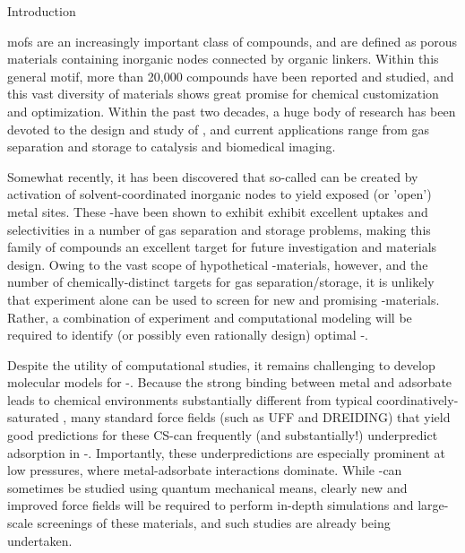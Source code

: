 \begin{section}{Introduction}

\Glspl{mof} are an increasingly important class of compounds, and are
defined as porous
materials containing inorganic nodes connected by organic linkers. Within
this general motif, more than 20,000 compounds have been reported and
studied,\cite{Furukawa2013} and this vast diversity of \mof materials shows great promise
for chemical customization and optimization. Within the past two decades, a
huge body of research has been devoted to the design and study of \mofs, and
current applications range from gas separation and storage to catalysis and
biomedical imaging.\cite{Furukawa2013}

Somewhat recently, it has been discovered that so-called \cus \mofs can be
created by activation of solvent-coordinated inorganic nodes to yield exposed
(or 'open') metal sites.\cite{Millward2005b,Dietzel2009,Dzubak2012} These \cus-\mofs have
been shown to exhibit exhibit excellent uptakes and selectivities in a number
of gas separation and storage problems,\cite{Czaja2009,Millward2005b,Dietzel2009}
making this family of compounds an excellent target for future
investigation and materials design. Owing to the vast scope of hypothetical
\cus-\mof materials, however, and the number of chemically-distinct targets
for gas separation/storage, it is unlikely that experiment alone can
be used to screen for new and promising \cus-\mof materials.\cite{Krishna2011} 
Rather, a combination of
experiment and computational modeling will be required to identify (or possibly
even rationally design) optimal \cus-\mofs.\cite{Getman2012,Czaja2009,Krishna2011}

Despite the utility of computational studies, it remains challenging to
develop molecular models for
\cus-\mofs.\cite{Dzubak2012,Krishna2011,Getman2012} Because the strong binding
between metal and adsorbate leads to chemical environments substantially
different from typical coordinatively-saturated \mofs, many standard force
fields (such as UFF and DREIDING) that yield good predictions for these
CS-\mofs can frequently (and substantially!) underpredict adsorption in
\cus-\mofs.\cite{Yazaydin2009,Krishna2011,Getman2012} Importantly, these
underpredictions are especially prominent at low pressures, where
metal-adsorbate interactions
dominate.\cite{Yazaydin2009,Krishna2011,Getman2012} While \cus-\mofs can
sometimes be studied using quantum mechanical
means,\cite{Getman2012,Valenzano2010,Poloni2014} clearly new and improved
force fields will be required to perform in-depth simulations and large-scale
screenings of these materials, and such studies are already being
undertaken.\cite{Lin2014,Haldoupis2015,Mercado2016,Becker2017}


\end{section}
